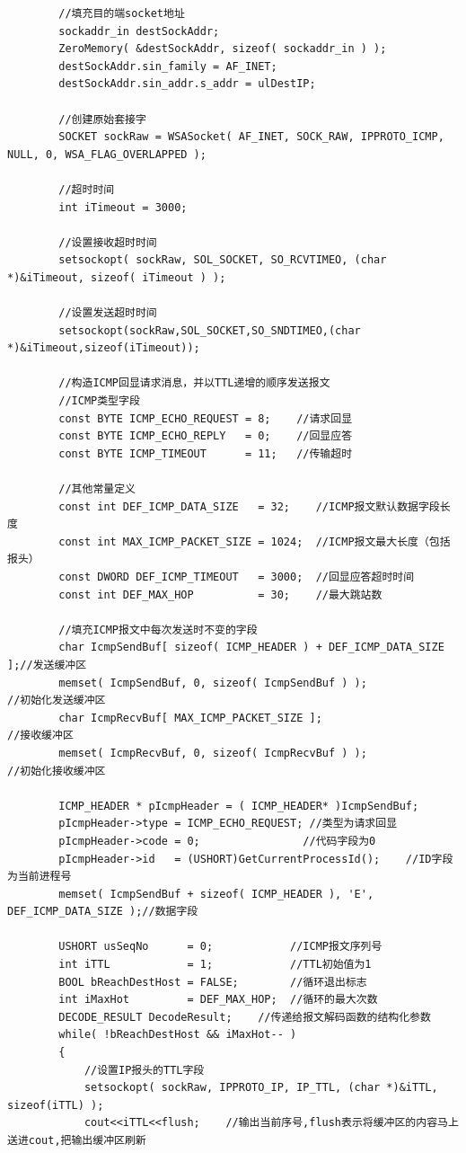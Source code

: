\documentclass[a4paper,UTF8]{article}
\begin{document}
\begin{lstlisting}
        //填充目的端socket地址
        sockaddr_in destSockAddr;
        ZeroMemory( &destSockAddr, sizeof( sockaddr_in ) );
        destSockAddr.sin_family = AF_INET;
        destSockAddr.sin_addr.s_addr = ulDestIP;

        //创建原始套接字
        SOCKET sockRaw = WSASocket( AF_INET, SOCK_RAW, IPPROTO_ICMP, NULL, 0, WSA_FLAG_OVERLAPPED );

        //超时时间
        int iTimeout = 3000;

        //设置接收超时时间
        setsockopt( sockRaw, SOL_SOCKET, SO_RCVTIMEO, (char *)&iTimeout, sizeof( iTimeout ) );

        //设置发送超时时间
        setsockopt(sockRaw,SOL_SOCKET,SO_SNDTIMEO,(char *)&iTimeout,sizeof(iTimeout));

        //构造ICMP回显请求消息，并以TTL递增的顺序发送报文
        //ICMP类型字段
        const BYTE ICMP_ECHO_REQUEST = 8;    //请求回显
        const BYTE ICMP_ECHO_REPLY   = 0;    //回显应答
        const BYTE ICMP_TIMEOUT      = 11;   //传输超时

        //其他常量定义
        const int DEF_ICMP_DATA_SIZE   = 32;    //ICMP报文默认数据字段长度
        const int MAX_ICMP_PACKET_SIZE = 1024;  //ICMP报文最大长度（包括报头）
        const DWORD DEF_ICMP_TIMEOUT   = 3000;  //回显应答超时时间
        const int DEF_MAX_HOP          = 30;    //最大跳站数

        //填充ICMP报文中每次发送时不变的字段
        char IcmpSendBuf[ sizeof( ICMP_HEADER ) + DEF_ICMP_DATA_SIZE ];//发送缓冲区
        memset( IcmpSendBuf, 0, sizeof( IcmpSendBuf ) );               //初始化发送缓冲区
        char IcmpRecvBuf[ MAX_ICMP_PACKET_SIZE ];                      //接收缓冲区
        memset( IcmpRecvBuf, 0, sizeof( IcmpRecvBuf ) );               //初始化接收缓冲区

        ICMP_HEADER * pIcmpHeader = ( ICMP_HEADER* )IcmpSendBuf;
        pIcmpHeader->type = ICMP_ECHO_REQUEST; //类型为请求回显
        pIcmpHeader->code = 0;                //代码字段为0
        pIcmpHeader->id   = (USHORT)GetCurrentProcessId();    //ID字段为当前进程号
        memset( IcmpSendBuf + sizeof( ICMP_HEADER ), 'E', DEF_ICMP_DATA_SIZE );//数据字段

        USHORT usSeqNo      = 0;            //ICMP报文序列号
        int iTTL            = 1;            //TTL初始值为1
        BOOL bReachDestHost = FALSE;        //循环退出标志
        int iMaxHot         = DEF_MAX_HOP;  //循环的最大次数
        DECODE_RESULT DecodeResult;    //传递给报文解码函数的结构化参数
        while( !bReachDestHost && iMaxHot-- )
        {
            //设置IP报头的TTL字段
            setsockopt( sockRaw, IPPROTO_IP, IP_TTL, (char *)&iTTL, sizeof(iTTL) );
            cout<<iTTL<<flush;    //输出当前序号,flush表示将缓冲区的内容马上送进cout,把输出缓冲区刷新


\end{lstlisting}
\end{document}
